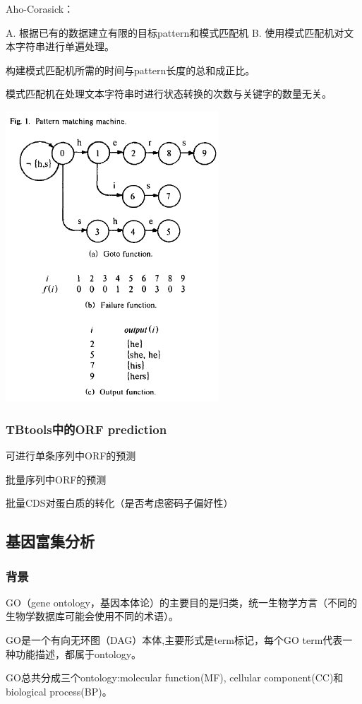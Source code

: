 Aho-Corasick：

    A. 根据已有的数据建立有限的目标pattern和模式匹配机
    B. 使用模式匹配机对文本字符串进行单遍处理。

构建模式匹配机所需的时间与pattern长度的总和成正比。

模式匹配机在处理文本字符串时进行状态转换的次数与关键字的数量无关。

\includegraphics[width=0.6\textwidth]{./image/gdk/8.2.1.png}
\subsubsection{TBtools中的ORF prediction}
可进行单条序列中ORF的预测

批量序列中ORF的预测

批量CDS对蛋白质的转化（是否考虑密码子偏好性）



\subsection{基因富集分析}
\subsubsection{背景}
GO（gene ontology，基因本体论）的主要目的是归类，统一生物学方言（不同的生物学数据库可能会使用不同的术语）。

GO是一个有向无环图（DAG）本体,主要形式是term标记，每个GO term代表一种功能描述，都属于ontology。

GO总共分成三个ontology:molecular function(MF), cellular component(CC)和biological process(BP)。

